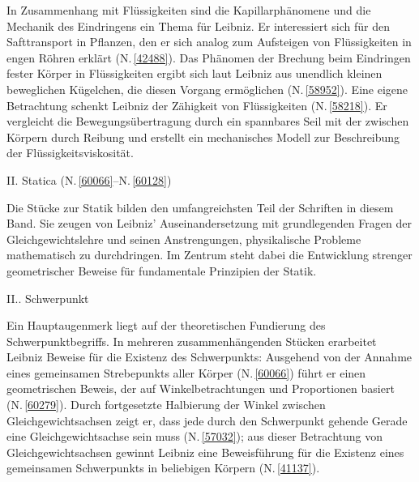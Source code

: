 \par
In Zusammenhang mit Flüssigkeiten sind die Kapillarphänomene und die Mechanik des Eindringens ein Thema für Leibniz. Er interessiert sich für den Safttransport in Pflanzen, den er sich analog zum Aufsteigen von Flüssigkeiten in engen Röhren erklärt (N.\,\ref{42488}). Das Phänomen der Brechung beim Eindringen fester Körper in Flüssigkeiten ergibt sich laut Leibniz aus unendlich kleinen beweglichen Kügelchen, die diesen Vorgang ermöglichen (N.\,\ref{58952}). %
Eine eigene Betrachtung schenkt Leibniz der Zähigkeit von Flüssigkeiten (N.\,\ref{58218}). Er vergleicht die Bewegungsübertragung durch ein spannbares Seil mit der zwischen Körpern durch Reibung und erstellt ein mechanisches Modell zur Beschreibung der Flüssigkeitsviskosität.%
\par
\vspace{2.0em}
\noindent
II. Statica (N.\,\ref{60066}--N.\,\ref{60128})%
\par
\vspace{0.25em}
\noindent
Die Stücke zur Statik bilden den umfangreichsten Teil der Schriften in diesem Band. Sie zeugen von Leibniz' Auseinandersetzung mit grundlegenden Fragen der Gleichgewichtslehre und seinen Anstrengungen, physikalische Probleme mathematisch zu durchdringen. Im Zentrum steht dabei die Entwicklung strenger geometrischer Beweise für fundamentale Prinzipien der Statik.%
\par
\vspace{1em}
\noindent
II.. Schwerpunkt%
\par\noindent
Ein Hauptaugenmerk liegt auf der theoretischen Fundierung des Schwerpunktbegriffs. In mehreren zusammenhängenden Stücken erarbeitet Leibniz Beweise für die Existenz des Schwerpunkts: Ausgehend von der Annahme eines gemeinsamen Strebepunkts aller Körper (N.\,\ref{60066}) führt er einen geometrischen Beweis, der auf Winkelbetrachtungen und Proportionen basiert (N.\,\ref{60279}). Durch fortgesetzte Halbierung der Winkel zwischen Gleichgewichtsachsen zeigt er, dass jede durch den Schwerpunkt gehende Gerade eine Gleichgewichtsachse sein muss (N.\,\ref{57032}); aus dieser Betrachtung von Gleichgewichtsachsen gewinnt Leibniz eine Beweisführung für die Existenz eines gemeinsamen Schwerpunkts in beliebigen Körpern (N.\,\ref{41137}). %

